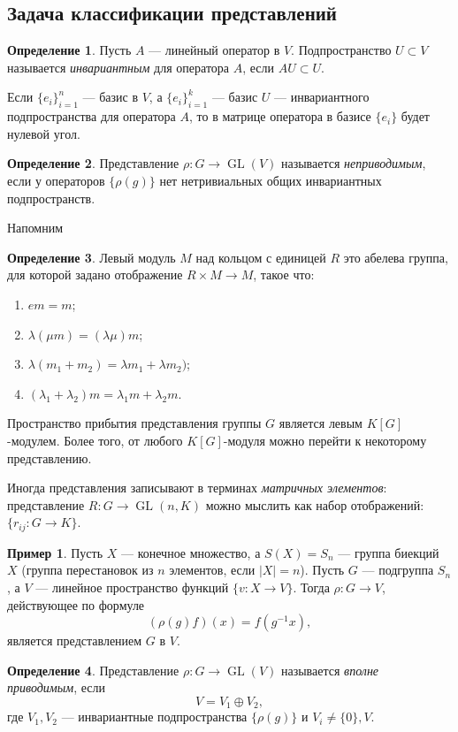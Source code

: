 \documentclass[12pt]{article}%
\DeclareMathOperator{\GL}{GL}
\theoremstyle{remark}
\theoremstyle{definition}
\newtheorem{Ex}{Пример}
\newtheorem{Def}{Определение}[section]
\begin{document}
\subsection{Задача классификации представлений}
\begin{Def}
Пусть $A$ — линейный оператор в $V$. Подпространство $U \subset V$ называется
\emph{инвариантным} для оператора $A$, если $AU \subset U$.
\end{Def}
Если $\{ e_i \}_{i=1}^n$ — базис в $V$, а $\{ e_i \}_{i=1}^k$ — базис $U$ —
инвариантного подпространства для оператора $A$, то в матрице оператора в базисе
$\{e_i\}$ будет нулевой угол.
\begin{Def}
Представление $\rho \colon G \to \GL(V)$ называется \emph{неприводимым}, если у
операторов $\{ \rho(g) \}$ нет нетривиальных общих инвариантных подпространств.
\end{Def}

Напомним
\begin{Def}
Левый модуль $M$ над кольцом с единицей $R$ это абелева группа, для которой
задано отображение $R\times M \to M$, такое что:
\begin{enumerate}
  \item $em = m$;
  \item $\lambda(\mu m) = (\lambda\mu)m$;
  \item $\lambda(m_1 + m_2) = \lambda m_1 + \lambda m_2)$;
  \item $(\lambda_1 + \lambda_2)m = \lambda_1 m + \lambda_2 m$.
\end{enumerate}
\end{Def}
Пространство прибытия представления группы $G$ является левым $K[G]$-модулем.
Более того, от любого $K[G]$-модуля можно перейти к некоторому представлению.

Иногда представления записывают в терминах \emph{матричных элементов}:
представление $R\colon G \to \GL(n, K)$ можно мыслить как набор отображений:
$\{ r_{ij} \colon G \to K \}$.

\begin{Ex}
Пусть $X$ — конечное множество, а $S(X) = S_n$ — группа биекций $X$ (группа
перестановок из $n$ элементов, если $|X|=n$). Пусть $G$ — подгруппа $S_n$, а
$V$ — линейное пространство функций $\{v \colon X \to V\}$. Тогда $\rho \colon
G \to V$, действующее по формуле
\[
    (\rho(g)f)(x) = f(g^{-1}x),
\]
является представлением $G$ в $V$.
\end{Ex}

\begin{Def}
Представление $\rho \colon G \to \GL(V)$ называется \emph{вполне приводимым},
если
\[
    V = V_1 \oplus V_2,
\]
где $V_1, V_2$ — инвариантные подпространства $\{\rho(g)\}$ и $V_i \neq \{0\},
V$.
\end{Def}
\end{document}

